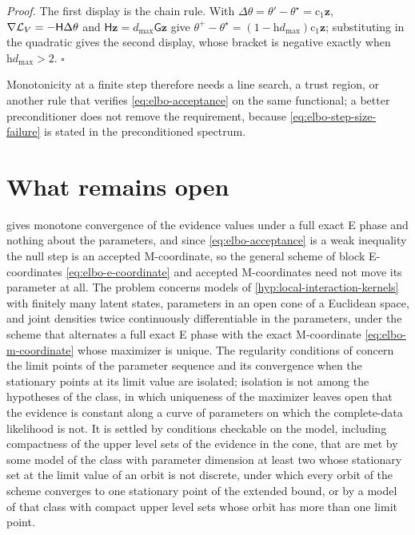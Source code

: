 \noindent\emph{Proof.}
The first display is the chain rule. With
$\Delta\theta=\theta'-\theta^\star=\mathrm c_1\mathbf z$,
$\nabla\mathcal L_V=-\mathsf H\Delta\theta$ and
$\mathsf H\mathbf z=d_{\max}\mathsf G\mathbf z$ give
$\theta^+-\theta^\star=(1-\mathrm hd_{\max})\mathrm c_1\mathbf z$; substituting
in the quadratic gives the second display, whose bracket is negative exactly
when $\mathrm hd_{\max}>2$. \hfill$\square$

Monotonicity at a finite step therefore needs a line search, a trust region,
or another rule that verifies \eqref{eq:elbo-acceptance} on the same
functional; a better preconditioner does not remove the requirement, because
\eqref{eq:elbo-step-size-failure} is stated in the preconditioned spectrum.

\section{What remains open}
\label{sec:elbo-open}

 gives monotone convergence of the
evidence values under a full exact E phase and nothing about the parameters,
and since \eqref{eq:elbo-acceptance} is a weak inequality the null step is an
accepted M-coordinate, so the general scheme of block E-coordinates
\eqref{eq:elbo-e-coordinate} and accepted M-coordinates need not move its
parameter at all. The problem concerns models of
\cref{hyp:local-interaction-kernels} with finitely many latent states,
parameters in an open cone of a Euclidean space, and joint densities twice
continuously differentiable in the parameters, under the scheme that
alternates a full exact E phase with the exact M-coordinate
\eqref{eq:elbo-m-coordinate} whose maximizer is unique. The regularity
conditions of \citet{Wu1983} concern the limit points of the parameter
sequence and its convergence when the stationary points at its limit value
are isolated; isolation is not among the hypotheses of the class, in which
uniqueness of the maximizer leaves open that the evidence is constant along
a curve of parameters on which the complete-data likelihood is not. It is
settled by conditions checkable on the model, including compactness of the
upper level sets of the evidence in the cone, that are met by some model of
the class with parameter dimension at least two whose stationary set at the
limit value of an orbit is not discrete, under which every orbit of the
scheme converges to one stationary point of the extended bound, or by a
model of that class with compact upper level sets whose orbit has more than
one limit point.


